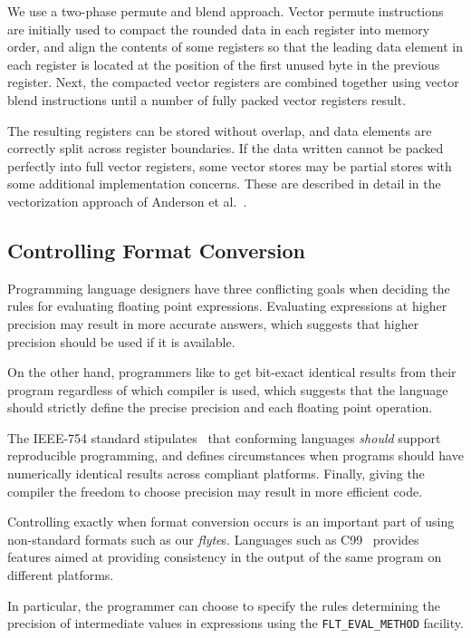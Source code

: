 \documentclass{sig-alternate-05-2015}
\newcommand{\mt}[1]{\texttt{#1}}
\begin{document}
We use a two-phase permute and blend approach. Vector
permute instructions are initially used to compact the rounded data in each
register into memory order, and align the contents of some registers so that
the leading data element in each register is located at the position of the
first unused byte in the previous register. Next, the compacted vector
registers are combined together using vector blend instructions until a number
of fully packed vector registers result.

The resulting registers can be stored without overlap, and data elements are
correctly split across register boundaries. If the data written cannot be
packed perfectly into full vector registers, some vector stores may be partial
stores with some additional implementation concerns. These are described in
detail in the vectorization approach of Anderson et
al.~\cite{anderson2015automatic}.

\subsection{Controlling Format Conversion}
\label{sec:whentoround}

Programming language designers have three conflicting goals when deciding the
rules for evaluating floating point expressions. Evaluating expressions at
higher precision may result in more accurate answers, which suggests that
higher precision should be used if it is available.

On the other hand, programmers like to get bit-exact identical results from
their program regardless of which compiler is used, which suggests that the
language should strictly define the precise precision and each floating point
operation.

The IEEE-754 standard stipulates~\cite[\S 11]{zuras2008ieee} that conforming
languages \emph{should} support reproducible programming, and defines
circumstances when programs should have numerically identical results across
compliant platforms. Finally, giving the compiler the freedom to choose
precision may result in more efficient code.

Controlling exactly when format conversion occurs is an important part of using
non-standard formats such as our \textit{flyte}s. Languages such as
C99~\cite{british2003c} provides features aimed at providing consistency in the
output of the same program on different platforms.

In particular, the programmer can choose to specify the rules determining the
precision of intermediate values in expressions using the
\mt{FLT\_EVAL\_METHOD} facility.
\end{document}
